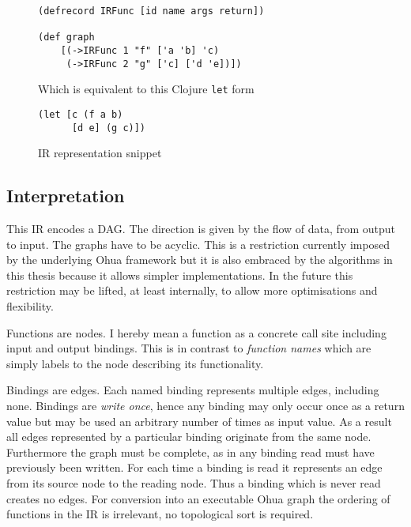 \begin{figure}
\begin{verbatim}
(defrecord IRFunc [id name args return])

(def graph
	[(->IRFunc 1 "f" ['a 'b] 'c)
	 (->IRFunc 2 "g" ['c] ['d 'e])])

\end{verbatim}
Which is equivalent to this Clojure \texttt{let} form
\begin{verbatim}
(let [c (f a b)
      [d e] (g c)])
\end{verbatim}
\caption{IR representation snippet}
\end{figure}

\subsection{Interpretation}

This IR encodes a DAG.
The direction is given by the flow of data, from output to input.
The graphs have to be acyclic.
This is a restriction currently imposed by the underlying Ohua framework but it is also embraced by the algorithms in this thesis because it allows simpler implementations.
In the future this restriction may be lifted, at least internally, to allow more optimisations and flexibility.

Functions are nodes.
I hereby mean a function as a concrete call site including input and output bindings.
This is in contrast to \textit{function names} which are simply labels to the node describing its functionality.

Bindings are edges.
Each named binding represents multiple edges, including none.
Bindings are \textit{write once}, hence any binding may only occur once as a return value but may be used an arbitrary number of times as input value.
As a result all edges represented by a particular binding originate from the same node.
Furthermore the graph must be complete, as in any binding read must have previously been written.
For each time a binding is read it represents an edge from its source node to the reading node.
Thus a binding which is never read creates no edges.
For conversion into an executable Ohua graph the ordering of functions in the IR is irrelevant, no topological sort is required.
